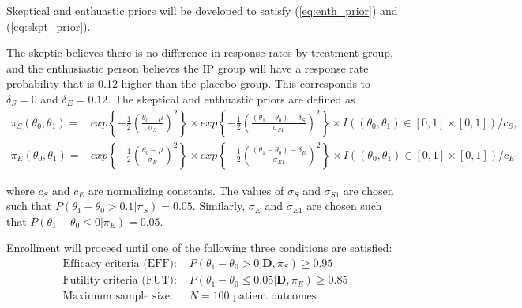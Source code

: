 \documentclass[12pt]{article}
\begin{document}
Skeptical and enthuastic priors will be developed to satisfy (\ref{eq:enth_prior}) and (\ref{eq:skpt_prior}).

The skeptic believes there is no difference in response rates by treatment group, and the enthusiastic person believes the IP group will have a response rate probability that is 0.12 higher than the placebo group. This corresponds to $\delta_S=0$ and $\delta_E=0.12$. The skeptical and enthuastic priors are defined as
\begin{align*}
\pi_S(\theta_0,\theta_1)=&exp\left\{-\frac{1}{2}\left(\frac{\theta_0-\mu}{\sigma_S}\right)^{2}\right\}\times exp\left\{-\frac{1}{2}\left(\frac{(\theta_1-\theta_0)-\delta_S}{\sigma_{S1}}\right)^{2}\right\}\times I((\theta_0,\theta_1)\in [0,1]\times[0,1]) /c_S,\\
\pi_E(\theta_0,\theta_1)=&exp\left\{-\frac{1}{2}\left(\frac{\theta_0-\mu}{\sigma_E}\right)^{2}\right\}\times exp\left\{-\frac{1}{2}\left(\frac{(\theta_1-\theta_0)-\delta_E}{\sigma_{E1}}\right)^{2}\right\}\times I((\theta_0,\theta_1)\in [0,1]\times[0,1]) /c_E
\end{align*}

where $c_S$ and $c_E$ are normalizing constants. The values of $\sigma_S$ and $\sigma_{S1}$ are chosen such that $P(\theta_1-\theta_0>0.1|\pi_S)=0.05$. Similarly, $\sigma_E$ and $\sigma_{E1}$ are chosen such that $P(\theta_1-\theta_0\leq0|\pi_E)=0.05$.







%				

Enrollment will proceed until one of the following three conditions are satisfied:
\begin{align*}
\text{Efficacy criteria (EFF): }&P(\theta_1-\theta_0>0|\mathbf{D},\pi_S)\geq 0.95\\
\text{Futility criteria (FUT): }&P(\theta_1-\theta_0 \leq 0.05|\mathbf{D},\pi_E)\geq 0.85\\
\text{Maximum sample size: }&N=100 \text{ patient outcomes}
\end{align*}
\end{document}
